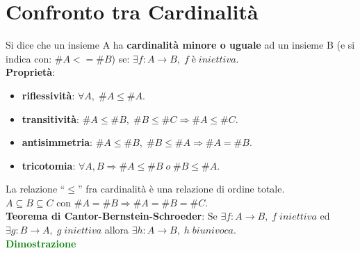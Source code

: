 \section{Confronto tra Cardinalità}
Si dice che un insieme A ha \textbf{cardinalità minore o uguale} ad un insieme B (e si indica con: $\#A <=\#B$) se: $\exists f : A \rightarrow B, \; f \; è \; iniettiva$. \\
\textbf{Proprietà}:
\begin{itemize}
    \item \textbf{riflessività}: $\forall A, \; \#A \leq \#A$.
    \item \textbf{transitività}: $\#A \leq \#B, \; \#B \leq \#C \Rightarrow \#A \leq \#C$.
    \item \textbf{antisimmetria}: $\#A \leq \#B, \; \#B \leq \#A \Rightarrow \#A = \#B$.
    \item \textbf{tricotomia}: $\forall A, B \Rightarrow \#A \leq \#B \; o \; \#B \leq \#A$.
\end{itemize}
La relazione ``$\leq$'' fra cardinalità è una relazione di ordine totale. \\
$A \subseteq B \subseteq C$ con $\#A = \#B \Rightarrow \#A = \#B = \#C$. \\
\newline
\textbf{Teorema di Cantor-Bernstein-Schroeder}: Se $\exists f : A \rightarrow B, \; f \; iniettiva$ ed $\exists g : B \rightarrow A, \; g \; iniettiva$ allora $\exists h : A \rightarrow B, \; h \; biunivoca$. \\
\textcolor{green}{\textbf{Dimostrazione}}